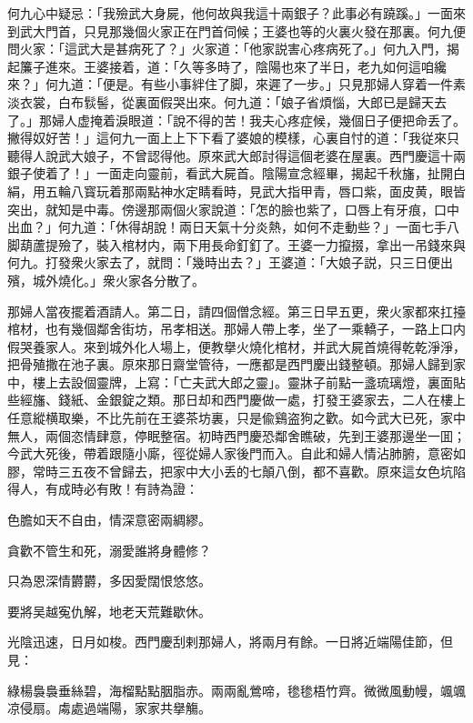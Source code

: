 何九心中疑忌：「我殮武大身屍，他何故與我這十兩銀子？此事必有蹺蹊。」一面來到武大門首，只見那幾個火家正在門首伺候；王婆也等的火裏火發在那裏。何九便問火家：「這武大是甚病死了？」火家道：「他家説害心疼病死了。」何九入門，揭起簾子進來。王婆接着，道：「久等多時了，陰陽也來了半日，老九如何這咱纔來？」何九道：「便是。有些小事絆住了脚，來遲了一步。」只見那婦人穿着一件素淡衣裳，白布䯼髻，從裏面假哭出來。何九道：「娘子省煩惱，大郎已是歸天去了。」那婦人虚掩着淚眼道：「說不得的苦！我夫心疼症候，幾個日子便把命丢了。撇得奴好苦！」這何九一面上上下下看了婆娘的模樣，心裏自忖的道：「我従來只聽得人說武大娘子，不曾認得他。原來武大郎討得這個老婆在屋裏。西門慶這十兩銀子使着了！」一面走向靈前，看武大屍首。陰陽宣念經畢，揭起千秋旛，扯開白絹，用五輪八寳玩着那兩點神水定睛看時，見武大指甲青，唇口紫，面皮黄，眼皆突出，就知是中毒。傍邊那兩個火家說道：「怎的臉也紫了，口唇上有牙痕，口中出血？」何九道：「休得胡說！兩日天氣十分炎熱，如何不走動些？」一面七手八脚葫蘆提殮了，裝入棺材内，兩下用長命釘釘了。王婆一力攛掇，拿出一吊錢來與何九。打發衆火家去了，就問：「幾時出去？」王婆道：「大娘子説，只三日便出殯，城外燒化。」衆火家各分散了。

那婦人當夜擺着酒請人。第二日，請四個僧念經。第三日早五更，衆火家都來扛擡棺材，也有幾個鄰舍街坊，吊孝相送。那婦人帶上孝，坐了一乘轎子，一路上口内假哭養家人。來到城外化人場上，便教擧火燒化棺材，并武大屍首燒得乾乾淨淨，把骨殖撒在池子裏。原來那日齋堂管待，一應都是西門慶出錢整頓。那婦人歸到家中，樓上去設個靈牌，上寫：「亡夫武大郎之靈」。靈牀子前點一盞琉璃燈，裏面貼些經旛、錢紙、金銀錠之類。那日却和西門慶做一處，打發王婆家去，二人在樓上任意縱横取樂，不比先前在王婆茶坊裏，只是偸鷄盗狗之歡。如今武大已死，家中無人，兩個恣情肆意，停眠整宿。初時西門慶恐鄰舍瞧破，先到王婆那邊坐一囬；今武大死後，帶着跟隨小廝，徑從婦人家後門而入。自此和婦人情沾肺腑，意密如膠，常時三五夜不曾歸去，把家中大小丢的七顛八倒，都不喜歡。原來這女色坑陷得人，有成時必有敗！有詩為證：

\begin{myquote}
色膽如天不自由，情深意密兩綢繆。

貪歡不管生和死，溺愛誰將身體修？

只為恩深情欝欝，多因愛闊恨悠悠。

要將吴越寃仇解，地老天荒難歇休。
\end{myquote}

光陰迅速，日月如梭。西門慶刮剌那婦人，將兩月有餘。一日將近端陽佳節，但見：
\begin{myquote}
綠楊裊裊垂絲碧，海榴點點胭脂赤。兩兩亂鶯啼，毶毶梧竹齊。微微風動幔，颯颯凉侵扇。䖏處過端陽，家家共擧觴。
\end{myquote}

